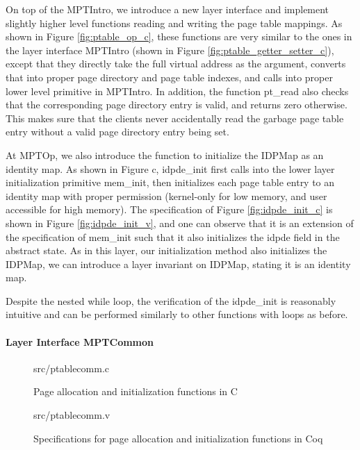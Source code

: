 On top of the MPTIntro, we introduce a new layer interface and implement
slightly higher level functions reading and writing the page table mappings.
As shown in Figure \ref{fig:ptable_op_c}, these functions are very similar
to the ones in the layer interface MPTIntro (shown in Figure \ref{fig:ptable_getter_setter_c}),
except that they directly take the full virtual address as the argument,
converts that into proper page directory and page table indexes, and
calls into proper lower level primitive in MPTIntro.
In addition, the function \textsf{pt\_read} also checks that the corresponding page
directory entry is valid, and returns zero otherwise.
This makes sure that the clients never accidentally read the garbage page table
entry without a valid page directory entry being set.

At MPTOp, we also introduce the function to initialize the \textsf{IDPMap} as an identity map.
As shown in Figure c, \textsf{idpde\_init} first calls into the lower layer
initialization primitive \textsf{mem\_init}, then initializes each page table entry to an identity
map with proper permission (kernel-only for low memory, and user accessible for high memory).
The specification of Figure \ref{fig:idpde_init_c} is shown in Figure \ref{fig:idpde_init_v},
and one can observe that it is an extension of the specification of \textsf{mem\_init}
such that it also initializes the \textsf{idpde} field in the abstract state.
As in this layer, our initialization method also initializes the \textsf{IDPMap}, we can
introduce a layer invariant on \textsf{IDPMap}, stating it is an identity map.

Despite the nested while loop, the verification of the \textsf{idpde\_init} is reasonably
intuitive and can be performed similarly to other functions with loops as before.


\paragraph{Layer Interface MPTCommon}


\begin{figure}
	 {src/ptablecomm.c}
	\caption{Page allocation and initialization functions in C}
	\label{fig:ptablecomm_c}
\end{figure}

\begin{figure}
	 {src/ptablecomm.v}
	\caption{Specifications for page allocation and initialization functions in Coq}
	\label{fig:ptablecomm_v}
\end{figure}


